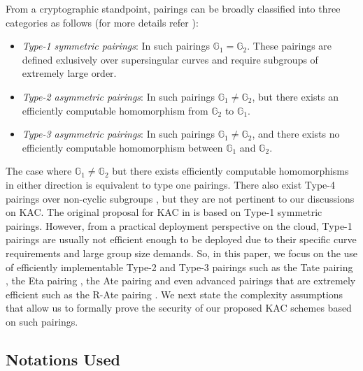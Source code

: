From a cryptographic standpoint, pairings can be broadly classified into three categories as follows (for more details refer \cite{galbraith2008pairings}):

\begin{itemize}
 \item \emph{Type-1 symmetric pairings}: In such pairings $\mathbb{G}_1 = \mathbb{G}_2$. These pairings are defined exlusively over supersingular curves and require subgroups of extremely large order. 
 \item \emph{Type-2 asymmetric pairings}: In such pairings $\mathbb{G}_1 \neq \mathbb{G}_2$, but there exists an efficiently computable homomorphism from $\mathbb{G}_2$ to $\mathbb{G}_1$.
 \item \emph{Type-3 asymmetric pairings}: In such pairings $\mathbb{G}_1 \neq \mathbb{G}_2$, and there exists no efficiently computable homomorphism between $\mathbb{G}_1$ and $\mathbb{G}_2$.
\end{itemize}

The case where $\mathbb{G}_1 \neq \mathbb{G}_2$ but there exists efficiently computable homomorphisms in either direction is equivalent to type one pairings. There also exist Type-4 pairings over non-cyclic subgroups \cite{galbraith2008pairings}, but they are not pertinent to our discussions on KAC. The original proposal for KAC in \cite{chu2014key} is based on Type-1 symmetric pairings. However, from a practical deployment perspective on the cloud, Type-1 pairings are usually not efficient enough to be deployed due to their specific curve requirements and large group size demands. So, in this paper, we focus on the use of efficiently implementable Type-2 and Type-3 pairings such as the Tate pairing \cite{frey1999tate}, the Eta pairing \cite{hess2006eta}, the Ate pairing \cite{beuchat2010high} and even advanced pairings that are extremely efficient such as the R-Ate pairing \cite{beuchat2010high}. We next state the complexity assumptions that allow us to formally prove the security of our proposed KAC schemes based on such pairings.

\subsection{Notations Used}
\label{subsec:notations}

